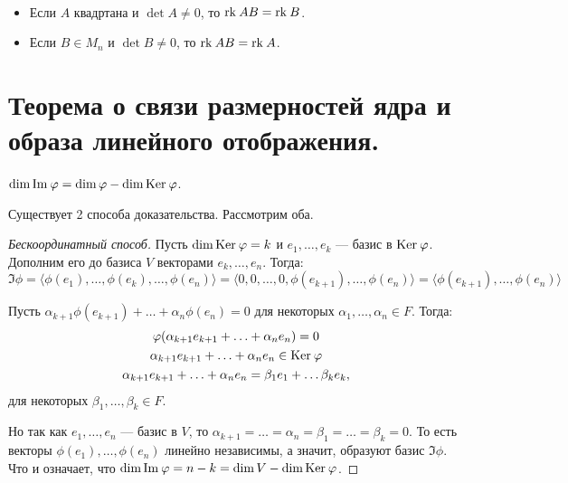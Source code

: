 \begin{Task}\
    \begin{itemize}
        \item Если $A$ квадртана и $\det A \neq 0$, то $\mathrm{rk}\: AB = \mathrm{rk}\: B$.
        \item Если $B \in M_n$ и $\det B \neq 0$, то $\mathrm{rk}\: AB = \mathrm{rk}\: A$.
    \end{itemize}
\end{Task}

\section{Теорема о связи размерностей ядра и образа линейного отображения.}

\begin{Theorem}
    $\dim \mathrm{Im\:} \varphi = \dim \varphi - \dim \mathrm{Ker}\: \varphi$.
\end{Theorem}

Существует 2 способа доказательства. Рассмотрим оба.

\begin{proof}[Бескоординатный способ]
     Пусть $\dim \mathrm{Ker}\: \varphi = k$ и $e_1, \ldots, e_k$ --- базис в $\mathrm{Ker}\: \varphi$. Дополним его до базиса $V$ векторами $e_k, \ldots, e_n$. Тогда:
    \[
        \Im \phi = \langle\phi(e_1), \ldots, \phi(e_k), \ldots, \phi(e_n)\rangle = \langle0, 0, \ldots, 0, \phi(e_{k+1}), \ldots, \phi(e_n)\rangle = \langle\phi(e_{k+1}), \ldots, \phi(e_{n})\rangle
    \]
    
Пусть $\alpha_{k+1}\phi(e_{k+1}) + \ldots + \alpha_n\phi(e_n) = 0$ для некоторых $\alpha_1, \ldots, \alpha_n \in F$. Тогда:
\begin{gather*}
    \varphi(\alpha_{k+1}e_{k+1} + \ldots + \alpha_ne_n) = 0 \\
    \alpha_{k+1}e_{k+1} + \ldots + \alpha_ne_n \in \mathrm{Ker}\: \varphi \\
    \alpha_{k+1}e_{k+1} + \ldots + \alpha_ne_n = \beta_1e_1 + \ldots \beta_ke_k,
\end{gather*}
для некоторых $\beta_1, \ldots, \beta_k \in F$.

Но так как $e_1, \ldots, e_n$ --- базис в $V$, то $\alpha_{k+1} =  \ldots = \alpha_n = \beta_1 = \ldots = \beta_k = 0$. То есть векторы $\phi(e_1), \ldots, \phi(e_n)$ линейно независимы, а значит, образуют базис $\Im \phi$. Что и означает, что $\dim\mathrm{Im\:}\varphi = n - k = \dim V - \dim\mathrm{Ker}\:\varphi$.
\end{proof}

